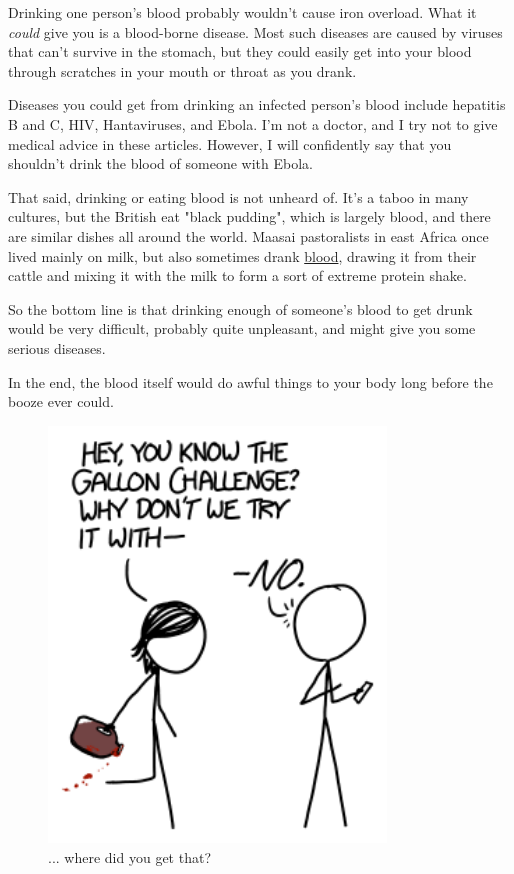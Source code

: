 {{Drinking one person's blood probably wouldn't cause iron overload. What it \emph{could} give you is a blood-borne disease. Most such diseases are caused by viruses that can't survive in the stomach, but they could easily get into your blood through scratches in your mouth or throat as you drank.}

{Diseases you could get from drinking an infected person's blood include hepatitis B and C, HIV, Hantaviruses, and Ebola. I'm not a doctor, and I try not to give medical advice in these articles. However, I will confidently say that you shouldn't drink the blood of someone with Ebola.}

{That said, drinking or eating blood is not unheard of. It's a taboo in many cultures, but the British eat "black pudding", which is largely blood, and there are similar dishes all around the world. Maasai pastoralists in east Africa once lived mainly on milk, but also sometimes drank \href{http://digitalcommons.calpoly.edu/cgi/viewcontent.cgi?article=1005&context=honors}{blood}, drawing it from their cattle and mixing it with the milk to form a sort of extreme protein shake.}

{So the bottom line is that drinking enough of someone's blood to get drunk would be very difficult, probably quite unpleasant, and might give you some serious diseases.}

{In the end, the blood itself would do awful things to your body long before the booze ever could.}

\begin{figure}[!htbp]
\centering
\includegraphics[scale=0.5, max width=0.8\textwidth]{imgs/a/98/gallon.png}
\caption{... where did you get that?}
\end{figure}

}
